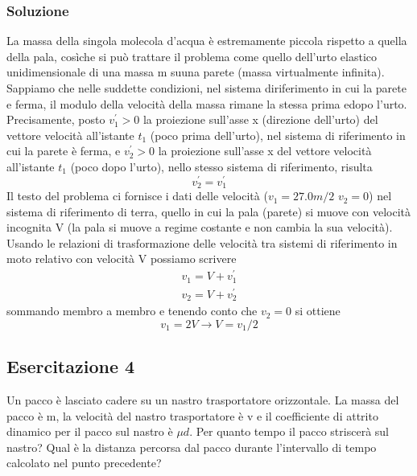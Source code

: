 \documentclass{book}
\begin{document}
\subsubsection{Soluzione}
La massa della singola molecola d’acqua è estremamente piccola rispetto a quella della pala, cosìche si può trattare il problema come quello dell’urto elastico unidimensionale di una massa m suuna parete (massa virtualmente infinita). Sappiamo che nelle suddette condizioni, nel sistema diriferimento in cui la parete e ferma, il modulo della velocità della massa rimane la stessa prima edopo l’urto. Precisamente, posto $v^\prime_1>0$  la proiezione sull’asse x (direzione dell’urto) del vettore velocità all’istante  $t_1$  (poco prima dell’urto), nel sistema di riferimento in cui la parete è ferma, e $v^\prime_2>0$  la proiezione sull’asse x del vettore velocità all’istante $t_1$ (poco dopo l'urto), nello stesso sistema di riferimento, risulta
\begin{equation*}
	v^\prime_2=v^\prime_1
\end{equation*}
Il testo del problema ci fornisce i dati delle velocità ($v_1=27.0m/2$ $v_2=0$) nel sistema di riferimento di terra, quello in cui la pala (parete) si muove con velocità incognita V (la pala si muove a regime costante e non cambia la sua velocità). Usando le relazioni di trasformazione delle velocità  tra sistemi di riferimento in moto relativo con velocità V possiamo scrivere
\begin{eqnarray*}
	v_1=V+v^\prime_1\\
	v_2=V+v^\prime_2
\end{eqnarray*}
sommando membro a membro e tenendo conto che $v_2=0$ si ottiene 
\begin{equation*}
	v_1=2V\to V=v_1/2
\end{equation*}
\subsection{Esercitazione 4}
Un pacco è lasciato cadere su un nastro trasportatore orizzontale. La massa del pacco è m, la velocità del nastro trasportatore è v e il coefficiente di attrito dinamico per il pacco sul nastro è $\mu d$. Per quanto tempo il pacco striscerà sul nastro? Qual è la distanza percorsa dal pacco durante l'intervallo di tempo calcolato nel punto precedente?
\end{document}
